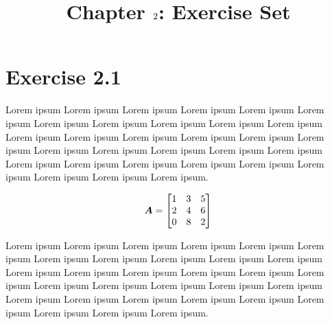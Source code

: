 \documentclass{article}
\author{}
\title{}
\date{\vspace{-5ex}}
\title{Chapter $\chapnumber$: Exercise Set}
\newcommand{\chapnumber}{2}
\begin{document}
\maketitle

\section*{Exercise \chapnumber.1}
Lorem ipsum Lorem ipsum Lorem ipsum Lorem ipsum Lorem ipsum Lorem ipsum Lorem ipsum Lorem ipsum Lorem ipsum Lorem ipsum Lorem ipsum Lorem ipsum
Lorem ipsum Lorem ipsum Lorem ipsum Lorem ipsum Lorem ipsum Lorem ipsum Lorem ipsum Lorem ipsum Lorem ipsum Lorem ipsum Lorem ipsum Lorem ipsum
Lorem ipsum Lorem ipsum Lorem ipsum Lorem ipsum Lorem ipsum Lorem ipsum Lorem ipsum.

\begin{equation}
{\bm{A}}
=
\begin{bmatrix}
    1 & 3 & 5 \\
    2 & 4 & 6 \\
    0 & 8 & 2 
\end{bmatrix}
\end{equation}

Lorem ipsum Lorem ipsum Lorem ipsum Lorem ipsum Lorem ipsum Lorem ipsum Lorem ipsum Lorem ipsum Lorem ipsum Lorem ipsum Lorem ipsum Lorem ipsum
Lorem ipsum Lorem ipsum Lorem ipsum Lorem ipsum Lorem ipsum Lorem ipsum Lorem ipsum Lorem ipsum Lorem ipsum Lorem ipsum Lorem ipsum Lorem ipsum
Lorem ipsum Lorem ipsum Lorem ipsum Lorem ipsum Lorem ipsum Lorem ipsum Lorem ipsum.
\end{document}
